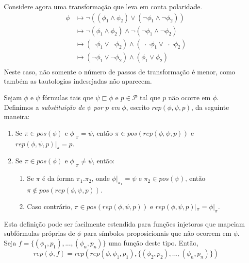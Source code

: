\begin{example}
    Considere agora uma transformação que leva em conta polaridade.
    \begin{equation*}
        \begin{split}
            \phi & \longmapsto \neg((\phi_1 \wedge \phi_2) \vee (\neg \phi_1 \wedge \neg \phi_2)) \\
                 & \longmapsto \neg(\phi_1 \wedge \phi_2) \wedge \neg(\neg \phi_1 \wedge \neg \phi_2) \\
                 & \longmapsto (\neg \phi_1 \vee \neg \phi_2) \wedge (\neg \neg \phi_1 \vee \neg \neg \phi_2) \\
                 & \longmapsto (\neg \phi_1 \vee \neg \phi_2) \wedge (\phi_1 \vee \phi_2) \\
        \end{split}
    \end{equation*}
    Neste caso, não somente o número de passos de transformação é menor, como também as tautologias indesejadas não aparecem.
\end{example}

\begin{definition}
	Sejam $\phi$ e $\psi$ fórmulas tais que $\psi \sqsubset \phi$ e $p \in \mathcal{P}$ tal que $p$ não ocorre em $\phi$. Definimos a \emph{substituição de} $\psi$ \emph{por} $p$ \emph{em} $\phi$, escrito $rep(\phi,\psi,p)$, da seguinte maneira:
	\begin{enumerate}
		\item Se $\pi \in pos(\phi)$ e $\phi|_\pi = \psi$, então $\pi \in pos(rep(\phi,\psi,p))$ e $rep(\phi,\psi,p)|_\pi = p$.
		\item Se $\pi \in pos(\phi)$ e $\phi|_\pi \neq \psi$, então:
		\begin{enumerate}
			\item Se $\pi$ é da forma $\pi_1.\pi_2$, onde $\phi|_{\pi_1} = \psi$ e $\pi_2 \in pos(\psi)$, então\break $\pi \notin pos(rep(\phi,\psi,p))$.
			\item Caso contrário, $\pi \in pos(rep(\phi,\psi,p))$ e $rep(\phi,\psi,p)|_\pi = \phi|_\pi$.
		\end{enumerate}
	\end{enumerate}
	
	Esta definição pode ser facilmente estendida para funções injetoras que mapeiam subfórmulas próprias de $\phi$ para símbolos proposicionais que não ocorrem em $\phi$. Seja $f = \{(\phi_1,p_1),...,(\phi_n,p_n)\}$ uma função deste tipo. Então, $$rep(\phi,f) = rep(rep(\phi,\phi_1,p_1),\{(\phi_2,p_2),...,(\phi_n,p_n)\})$$
\end{definition}


